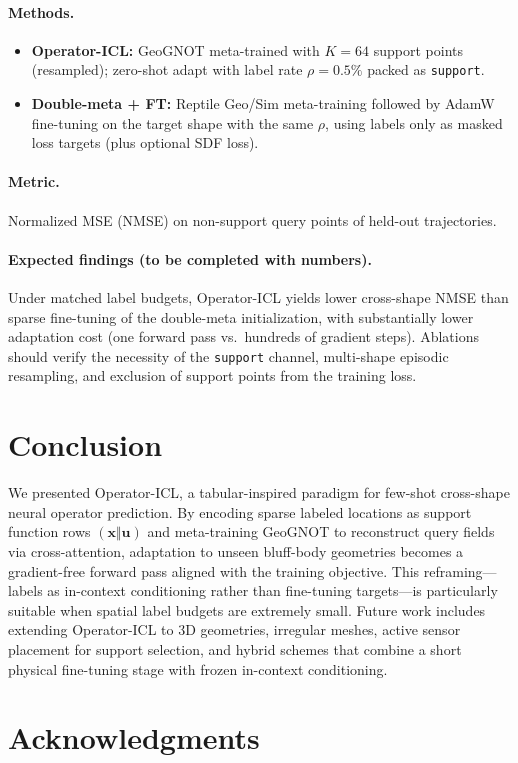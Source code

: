 \documentclass[11pt,a4paper]{article}
\begin{document}
\paragraph{Methods.}
\begin{itemize}[leftmargin=1.2em]
    \item \textbf{Operator-ICL:} GeoGNOT meta-trained with $K{=}64$ support points (resampled); zero-shot adapt with label rate $\rho{=}0.5\%$ packed as \texttt{support}.
    \item \textbf{Double-meta + FT:} Reptile Geo/Sim meta-training followed by AdamW fine-tuning on the target shape with the same $\rho$, using labels only as masked loss targets (plus optional SDF loss).
\end{itemize}

\paragraph{Metric.}
Normalized MSE (NMSE) on non-support query points of held-out trajectories.

\paragraph{Expected findings (to be completed with numbers).}
Under matched label budgets, Operator-ICL yields lower cross-shape NMSE than sparse fine-tuning of the double-meta initialization, with substantially lower adaptation cost (one forward pass vs.\ hundreds of gradient steps).
Ablations should verify the necessity of the \texttt{support} channel, multi-shape episodic resampling, and exclusion of support points from the training loss.

\section{Conclusion}
\label{sec:conclusion}

We presented Operator-ICL, a tabular-inspired paradigm for few-shot cross-shape neural operator prediction.
By encoding sparse labeled locations as support function rows $(\mathbf{x}\Vert\mathbf{u})$ and meta-training GeoGNOT to reconstruct query fields via cross-attention, adaptation to unseen bluff-body geometries becomes a gradient-free forward pass aligned with the training objective.
This reframing---labels as in-context conditioning rather than fine-tuning targets---is particularly suitable when spatial label budgets are extremely small.
Future work includes extending Operator-ICL to 3D geometries, irregular meshes, active sensor placement for support selection, and hybrid schemes that combine a short physical fine-tuning stage with frozen in-context conditioning.

\section*{Acknowledgments}



\end{document}
